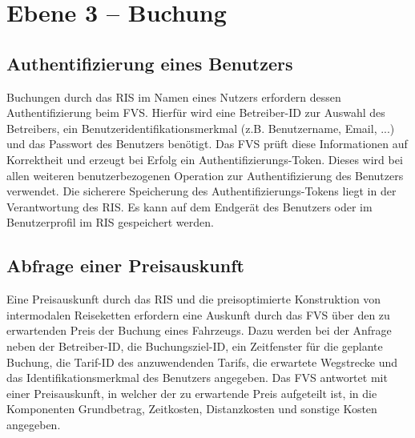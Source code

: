 \section{Ebene 3 -- Buchung}

\subsection{Authentifizierung eines Benutzers}
Buchungen durch das RIS im Namen eines Nutzers erfordern dessen Authentifizierung beim FVS.
Hierfür wird eine Betreiber-ID zur Auswahl des Betreibers, ein Benutzeridentifikationsmerkmal (z.B. Benutzername, Email, ...) und das Passwort des Benutzers benötigt. Das FVS prüft diese Informationen auf Korrektheit und erzeugt bei Erfolg ein Authentifizierungs-Token. Dieses wird bei allen weiteren benutzerbezogenen Operation zur Authentifizierung des Benutzers verwendet. Die sicherere Speicherung des Authentifizierungs-Tokens liegt in der Verantwortung des RIS. Es kann auf dem Endgerät des Benutzers oder im Benutzerprofil im RIS gespeichert werden.

\subsection{Abfrage einer Preisauskunft}
Eine Preisauskunft durch das RIS und die preisoptimierte Konstruktion von intermodalen Reiseketten erfordern eine Auskunft durch das FVS über den zu erwartenden Preis der Buchung eines Fahrzeugs.
Dazu werden bei der Anfrage neben der Betreiber-ID, die Buchungsziel-ID, ein Zeitfenster für die geplante Buchung, die Tarif-ID des anzuwendenden Tarifs, die erwartete Wegstrecke und das Identifikationsmerkmal des Benutzers angegeben. Das FVS antwortet mit einer Preisauskunft, in welcher der zu erwartende Preis aufgeteilt ist, in die Komponenten Grundbetrag, Zeitkosten, Distanzkosten und sonstige Kosten angegeben.
 
